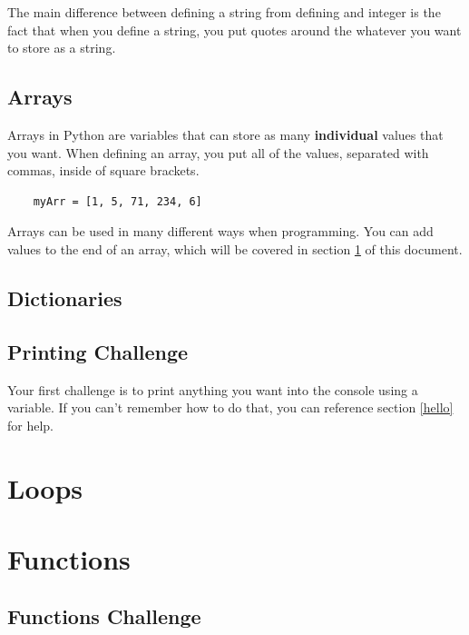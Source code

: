 \documentclass[12pt, letterpaper]{article}
\begin{document}
    The main difference between defining a string from defining and integer is the fact that when you define a string, you put quotes around the whatever you want to store as a string.

    \subsection{Arrays} \label{arrays}

    Arrays in Python are variables that can store as many \textbf{individual} values that you want. When defining an array, you put all of the values, separated with commas, inside of square brackets.

    \begin{verbatim}
    myArr = [1, 5, 71, 234, 6]
    \end{verbatim}

    Arrays can be used in many different ways when programming. You can add values to the end of an array, which will be covered in section \ref{loops} of this document.
    
    \subsection{Dictionaries} \label{dictionaries}



    \subsection{Printing Challenge} \label{hellochallenge}
    
    Your first challenge is to print anything you want into the console using a variable. If you can't remember how to do that, you can reference section \ref{hello} for help.

    \section{Loops} \label{loops}

    \section{Functions} \label{functions}

    \subsection{Functions Challenge} \label{functionschallenge}
\end{document}
